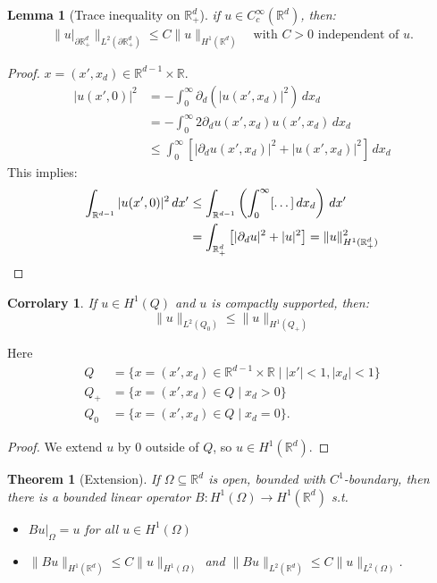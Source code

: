 \documentclass{report}
\theoremstyle{tommy}
\newtheorem{thm}[defn]{Theorem}
\newtheorem{lem}[defn]{Lemma}
\newtheorem{cor}[defn]{Corrolary}
\begin{document}
  \begin{lem}[Trace inequality on \(\mathbb{R}_+^d\)] if \(u \in C_c^\infty(\mathbb{R}^d)\), then:
    \begin{align*}
      \|u|_{\partial \mathbb{R}_+^d}\|_{L^2(\partial \mathbb{R}_+^d)} \le C \|u\|_{H^1(\mathbb{R}^d)} \quad \text{with } C > 0 \text{ independent of \(u\).}
    \end{align*}
  \end{lem}

  \begin{proof}
    \(x = (x', x_d) \in \mathbb{R}^{d-1} \times \mathbb{R}\). 
    \begin{align*}
      |u(x', 0)|^2 &= - \int_0^\infty \partial_d(|u(x', x_d)|^2) \, dx_d \\
      &= - \int_0^\infty 2\partial_d u(x', x_d) u(x', x_d) \, dx_d \\
      &\le \int_0^\infty \left[|\partial_d u(x', x_d)|^2 + |u(x', x_d)|^2\right] \, dx_d
    \end{align*}
    This implies:
    \begin{align*}
      \int_{\mathbb{R}^{d-1}} |u(x',0)|^2 \, dx'
      &\le \int_{\mathbb{R}^{d-1}} \left(\int_0^\infty [\dots] \, dx_d\right) \, dx' \\
      &= \int_{\mathbb{R}_+^d} \left[|\partial_d u|^2 + |u|^2\right] = \|u\|^2_{H^1(\mathbb{R}_+^d)} \qedhere
    \end{align*}
  \end{proof}
  
  \begin{cor}
    If \(u \in H^1(Q)\) and \(u\) is compactly supported, then:
    \[\|u\|_{L^2(Q_0)} \le \|u\|_{H^1(Q_+)}\]
  \end{cor}
  Here \begin{align*}
    Q &= \{x = (x', x_d) \in \mathbb{R}^{d-1} \times \mathbb{R} \mid |x'| < 1, |x_d| < 1\} \\
    Q_+ &= \{x = (x', x_d) \in Q \mid x_d > 0\} \\
    Q_0 &= \{x = (x', x_d) \in Q \mid x_d = 0\}.
  \end{align*}

  \begin{proof}
    We extend \(u\) by \(0\) outside of \(Q\), so \(u \in H^1(\mathbb{R}^d)\).
  \end{proof}

  \begin{thm}[Extension]\label{extension-theorem} If \(\Omega \subseteq \mathbb{R}^d\) is open, bounded with \(C^1\)-boundary, then there is a bounded linear operator \(B: H^1(\Omega) \to H^1(\mathbb{R}^d)\) s.t. 
  \begin{itemize}
    \item \(Bu|_\Omega = u\) for all \(u \in H^1(\Omega)\)
    \item \(\|Bu\|_{H^1(\mathbb{R}^d)} \le C \|u\|_{H^1(\Omega)}\) and \(\|Bu\|_{L^2(\mathbb{R}^d)}\le C \|u\|_{L^2(\Omega)}\).
  \end{itemize}
  \end{thm}
\end{document}
